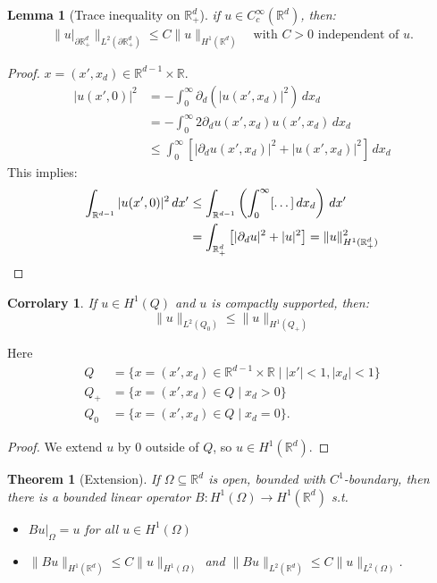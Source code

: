 \documentclass{report}
\theoremstyle{tommy}
\newtheorem{thm}[defn]{Theorem}
\newtheorem{lem}[defn]{Lemma}
\newtheorem{cor}[defn]{Corrolary}
\begin{document}
  \begin{lem}[Trace inequality on \(\mathbb{R}_+^d\)] if \(u \in C_c^\infty(\mathbb{R}^d)\), then:
    \begin{align*}
      \|u|_{\partial \mathbb{R}_+^d}\|_{L^2(\partial \mathbb{R}_+^d)} \le C \|u\|_{H^1(\mathbb{R}^d)} \quad \text{with } C > 0 \text{ independent of \(u\).}
    \end{align*}
  \end{lem}

  \begin{proof}
    \(x = (x', x_d) \in \mathbb{R}^{d-1} \times \mathbb{R}\). 
    \begin{align*}
      |u(x', 0)|^2 &= - \int_0^\infty \partial_d(|u(x', x_d)|^2) \, dx_d \\
      &= - \int_0^\infty 2\partial_d u(x', x_d) u(x', x_d) \, dx_d \\
      &\le \int_0^\infty \left[|\partial_d u(x', x_d)|^2 + |u(x', x_d)|^2\right] \, dx_d
    \end{align*}
    This implies:
    \begin{align*}
      \int_{\mathbb{R}^{d-1}} |u(x',0)|^2 \, dx'
      &\le \int_{\mathbb{R}^{d-1}} \left(\int_0^\infty [\dots] \, dx_d\right) \, dx' \\
      &= \int_{\mathbb{R}_+^d} \left[|\partial_d u|^2 + |u|^2\right] = \|u\|^2_{H^1(\mathbb{R}_+^d)} \qedhere
    \end{align*}
  \end{proof}
  
  \begin{cor}
    If \(u \in H^1(Q)\) and \(u\) is compactly supported, then:
    \[\|u\|_{L^2(Q_0)} \le \|u\|_{H^1(Q_+)}\]
  \end{cor}
  Here \begin{align*}
    Q &= \{x = (x', x_d) \in \mathbb{R}^{d-1} \times \mathbb{R} \mid |x'| < 1, |x_d| < 1\} \\
    Q_+ &= \{x = (x', x_d) \in Q \mid x_d > 0\} \\
    Q_0 &= \{x = (x', x_d) \in Q \mid x_d = 0\}.
  \end{align*}

  \begin{proof}
    We extend \(u\) by \(0\) outside of \(Q\), so \(u \in H^1(\mathbb{R}^d)\).
  \end{proof}

  \begin{thm}[Extension]\label{extension-theorem} If \(\Omega \subseteq \mathbb{R}^d\) is open, bounded with \(C^1\)-boundary, then there is a bounded linear operator \(B: H^1(\Omega) \to H^1(\mathbb{R}^d)\) s.t. 
  \begin{itemize}
    \item \(Bu|_\Omega = u\) for all \(u \in H^1(\Omega)\)
    \item \(\|Bu\|_{H^1(\mathbb{R}^d)} \le C \|u\|_{H^1(\Omega)}\) and \(\|Bu\|_{L^2(\mathbb{R}^d)}\le C \|u\|_{L^2(\Omega)}\).
  \end{itemize}
  \end{thm}
\end{document}
